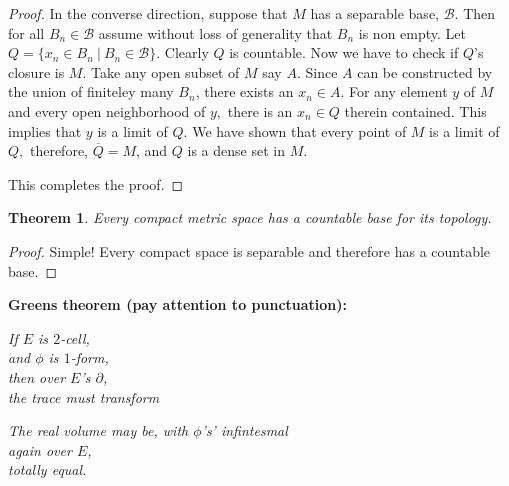 \documentclass[letter]{article}
\newtheorem{theorem}{Theorem}
\newenvironment{menumerate}{%
  \edef\backupindent{\the\parindent}%
  \enumerate%
  \setlength{\parindent}{\backupindent}%
}{\endenumerate}
\begin{document}
\begin{menumerate}
\begin{proof}
				In the converse direction, suppose that $M$ has a separable base, $\mathcal{B}.$ Then for all $B_n \in \mathcal{B}$ assume without loss of generality that $B_n$ is non empty. Let $Q = \{x_n \in B_n \ |\ B_n \in \mathcal{B}\}$. Clearly $Q$ is countable. Now we have to check if $Q$'s closure is $M.$ Take any open subset of $M$ say $A$. Since $A$ can be constructed by the union of finiteley many $B_n$, there exists an $x_n \in A.$ For any element $y$ of $M$ and every open neighborhood of $y,$ there is an $x_n \in Q$ therein contained. This implies that $y$ is a limit of $Q.$ We have shown that every point of $M$ is a limit of $Q,$ therefore, $\overline{Q} = M$, and $Q$ is a dense set in $M.$ 

				This completes the proof.  
			
		\end{proof}
		\begin{theorem}
		Every compact metric space has a countable base for its topology.
		\end{theorem}
		\begin{proof}
			Simple! Every compact space is separable and therefore has a countable base.
		\end{proof}


	\setcounter{enumi}{132}
	\item 

	\setcounter{enumi}{151}
	\item \textbf{Greens theorem (pay attention to punctuation):}

	\emph{If $E$ is $2$-cell, \\
		and $\phi$ is $1$-form, \\ 
		then over $E$'s $\partial$, \\
		the trace must transform }

		\emph{		The real volume may be, 
		with $\phi$'s' infintesmal \\
		again over $E$, \\
		totally equal.}
\end{menumerate}
\end{document}
